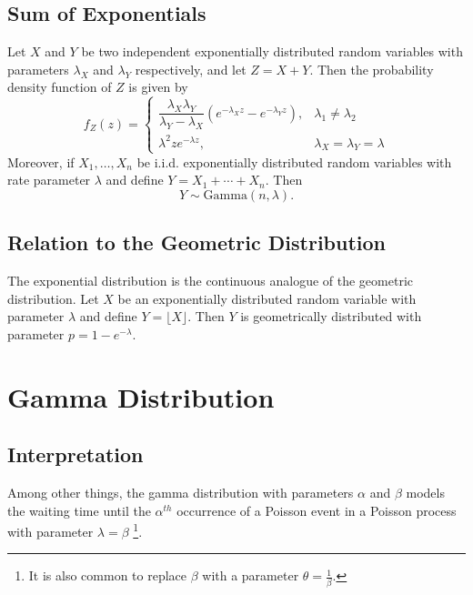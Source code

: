 \documentclass[1pt]{report}
\newcommand{\<}{\langle}
\renewcommand{\>}{\rangle}
\begin{document}
\subsection{Sum of Exponentials}
Let $X$ and $Y$ be two independent exponentially distributed random variables with parameters $\lambda_X$ and $\lambda_Y$ respectively, and let $Z = X + Y$. Then the probability density function of $Z$ is given by
$$f_Z(z) = \begin{cases} \dfrac{\lambda_X\lambda_Y}{\lambda_Y - \lambda_X} \left(e^{-\lambda_Xz} - e^{-\lambda_Y z}\right), & \lambda_1 \neq \lambda_2\\ \lambda^2 z e^{-\lambda z}, & \lambda_X = \lambda_Y = \lambda \end{cases}$$
Moreover, if $X_1,\dots, X_n$ be i.i.d. exponentially distributed random variables with rate parameter $\lambda$ and define $Y = X_1 + \cdots + X_n$. Then
$$Y \sim \text{Gamma}(n, \lambda).$$
\subsection{Relation to the Geometric Distribution} 
The exponential distribution is the continuous analogue of the geometric distribution. Let $X$ be an exponentially distributed random variable with parameter $\lambda$ and define $Y = \lfloor X \rfloor$. Then $Y$ is geometrically distributed with parameter $p = 1- e^{-\lambda}$.
\newpage
\section{Gamma Distribution}
\subsection{Interpretation}
Among other things, the gamma distribution with parameters $\alpha$ and $\beta$ models the waiting time until the $\alpha^{th}$ occurrence of a Poisson event in a Poisson process with parameter $\lambda = \beta$ \footnote{It is also common to replace $\beta$ with a parameter $\theta = \frac{1}{\beta}$.}.
\end{document}

